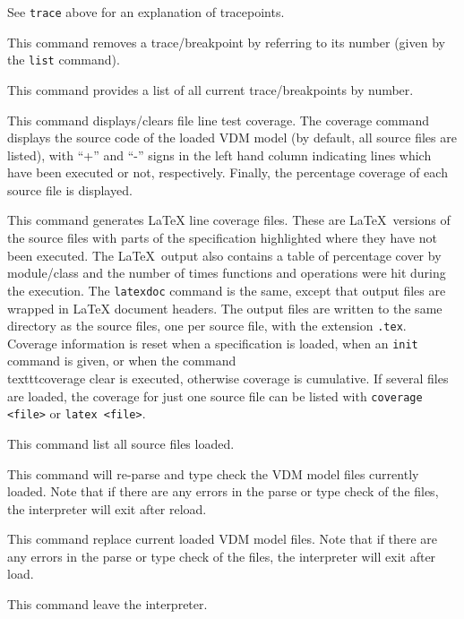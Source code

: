 \documentclass{overturerepchap}
\begin{document}
\begin{description}
  See \texttt{trace} above for an explanation of tracepoints.
\item[\texttt{remove <breakpoint\#>}:] This command removes a
  trace/breakpoint by referring to its number (given by the
  \texttt{list} command).  
\item[\texttt{list}:] This command provides a list of all current
  trace/breakpoints by number.  
\item[\texttt{coverage [<file>|clear]}:] This command displays/clears
  file line test coverage. The coverage command displays the source
  code of the loaded VDM model (by default, all source files are
  listed), with ``+'' and ``-'' signs in the left hand column indicating
  lines which have been executed or not, respectively. Finally, the
  percentage coverage of each source file is
  displayed.  
\item[\texttt{latex|latexdoc [<files>]}:] This command generates LaTeX
  line coverage files. These are \LaTeX\ versions of the source files
  with parts of the
  specification highlighted where they have not been executed. The
  \LaTeX\ output also contains a table of percentage cover by
  module/class and the number of times functions and operations were
  hit during the execution. The \texttt{latexdoc} command is the same,
  except that output files are wrapped in LaTeX document headers. The
  output files are written to the same directory as the source files, one
  per source file, with the extension \texttt{.tex}. Coverage
  information is reset when a specification is loaded, when an \texttt{init}
  command is given, or when the
  command \\texttt{coverage clear} is executed, otherwise coverage is
  cumulative. If several files are loaded, the coverage for just one
  source file can be listed with \texttt{coverage <file>} or
  \texttt{latex <file>}.  
\item[\texttt{files}:] This command list all source files loaded.
\item[\texttt{reload}:] This command will re-parse and type check the
  VDM model files currently loaded. Note that if there are any errors
  in the parse or type check of the files, the interpreter will exit
  after reload. 
\item[\texttt{load <files>}:] This command replace current loaded VDM
  model files. Note that if there are any errors in the parse or type
  check of the files, the interpreter will exit after
  load.  
\item[\texttt{[q]uit}:] This command leave the
  interpreter.  
\end{description}
\end{document}
